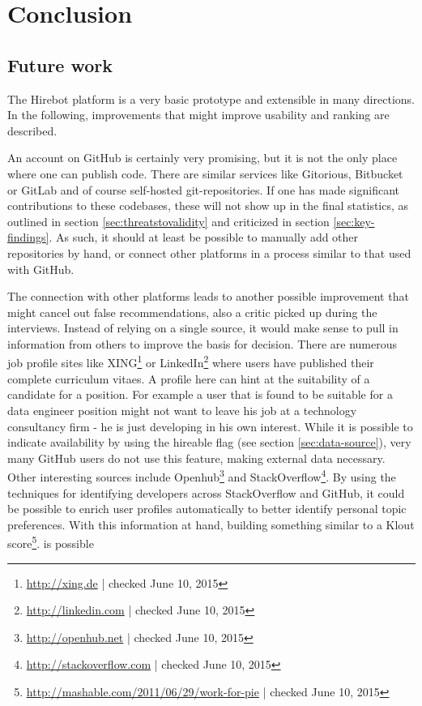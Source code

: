 \chapter{Conclusion}\label{ch:conclusion}
\section{Future work}\label{sec:future-work}
The Hirebot platform is a very basic prototype and extensible in many directions. In the following, improvements that might improve usability and ranking are described.

An account on GitHub is certainly very promising, but it is not the only place where one can publish code. There are similar services like Gitorious, Bitbucket or GitLab and of course self-hosted git-repositories. If one has made significant contributions to these codebases, these will not show up in the final statistics, as outlined in section \ref{sec:threatstovalidity} and criticized in section \ref{sec:key-findings}. As such, it should at least be possible to manually add other repositories by hand, or connect other platforms in a process similar to that used with GitHub.

The connection with other platforms leads to another possible improvement that might cancel out false recommendations, also a critic picked up during the interviews. Instead of relying on a single source, it would make sense to pull in information from others to improve the basis for decision. There are numerous job profile sites like XING\footnote{\url{http://xing.de} | checked June 10, 2015} or LinkedIn\footnote{\url{http://linkedin.com} | checked June 10, 2015} where users have published their complete curriculum vitaes. A profile here can hint at the suitability of a candidate for a position. For example a user that is found to be suitable for a data engineer position might not want to leave his job at a technology consultancy firm - he is just developing in his own interest. While it is possible to indicate availability by using the hireable flag (see section \ref{sec:data-source}), very many GitHub users do not use this feature, making external data necessary. Other interesting sources include Openhub\footnote{\url{http://openhub.net} | checked June 10, 2015} and StackOverflow\footnote{\url{http://stackoverflow.com} | checked June 10, 2015}. By using the techniques for identifying developers across StackOverflow and GitHub\cite{vfs:2012}, it could be possible to enrich user profiles automatically to better identify personal topic preferences. With this information at hand, building something similar to a Klout score\footnote{\url{http://mashable.com/2011/06/29/work-for-pie} | checked June 10, 2015}. is possible

